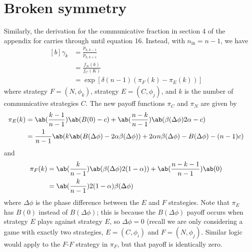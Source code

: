 \documentclass[pdflatex,lineno,referee,sn-mathphys-ay]{sn-jnl}
\begin{document}
\section{Broken symmetry}
Similarly, the derivation for the communicative fraction
in section 4 of the appendix for \cite{tripp2022evolutionary} carries
through until equation 16.
Instead, with $n_{\text{in}} = n-1$, we have
\begin{equation}
  \begin{aligned}[b]
  \gamma_k &= \frac{p_{k,k-1}}{p_{k,k+1}} \\
           &= \frac{f_N(k)}{f_C(K)} \\
           &= \exp[\delta (n-1) (\pi_F(k) - \pi_E(k))]
\end{aligned}
\end{equation}
where strategy $F=(N,\phi_k)$, strategy $E=(C,\phi_j)$, and $k$ is the
number of communicative strategies $C$.
The new payoff functions $\pi_C$ and $\pi_N$ are given by
\begin{align}
  \pi_E(k) &= \ab(\frac{k-1}{n-1}) \ab(B(0) - c)
                + \ab(\frac{n-k}{n-1}) \ab(\beta(\Delta\phi) 2\alpha - c) \\
           &= \frac{1}{n-1}
               \ab(k \ab(B(\Delta\phi) - 2 \alpha \beta(\Delta\phi))
                 + 2 \alpha n \beta(\Delta\phi) - B(\Delta\phi) - (n-1) c)
\end{align}
and
\begin{align}
  \pi_F(k) &= \ab(\frac{k}{n-1}) \ab(\beta(\Delta\phi) 2 (1-\alpha))
                + \ab(\frac{n-k-1}{n-1}) \ab(0) \\
           &= \ab(\frac{k}{n-1}) 2 (1-\alpha) \beta(\Delta\phi)
\end{align}
where $\Delta \phi$ is the phase difference between the $E$ and $F$
strategies.
Note that $\pi_E$ has $B(0)$ instead of $B(\Delta \phi)$; this is
because the $B(\Delta \phi)$ payoff occurs when strategy $E$ plays
against strategy $E$, so $\Delta \phi = 0$ (recall we are only
considering a game with exactly two strategies, $E = (C, \phi_i)$ and
$F = (N, \phi_j)$.
Similar logic would apply to the $F$-$F$ strategy in $\pi_F$, but that
payoff is identically zero.
\end{document}
